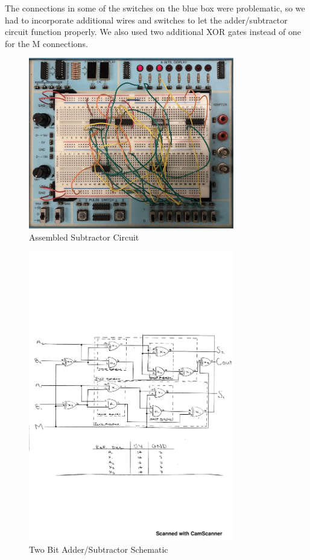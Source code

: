 \documentclass[11pt]{article}
\begin{document}
The connections in some of the switches on the blue box were problematic, so we had to incorporate additional wires and switches to let the adder/subtractor circuit function properly. We also used two additional XOR gates instead of one for the M connections.

\clearpage
	
\begin{figure}\centering
	\includegraphics[width=0.8\textwidth,trim=0cm 0cm 0cm 0cm,clip]{Assembled_Subtractor}
	\caption{Assembled Subtractor Circuit}
	\label{fig:Subtractor_Circuit}	
\end{figure}

\begin{figure}\centering
	\includegraphics[width=0.8\textwidth,trim=0.3cm 6.8559cm 0cm 8cm,clip]{Two_Bit_Adder_and_Subtractor_Schematic}
	\caption{Two Bit Adder/Subtractor Schematic}
	\label{fig:Subtractor_Schematic}	
\end{figure}
\end{document}
